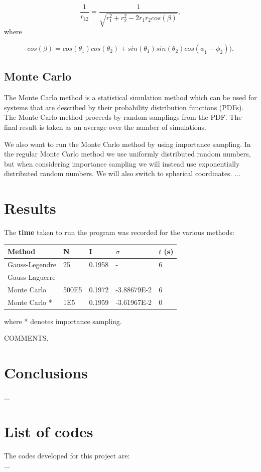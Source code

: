 \documentclass{article}
\begin{document}
\begin{multicols}{2}
\begin{equation*}
\frac{1}{r_{12}}= \frac{1}{\sqrt{r_1^2+r_2^2-2r_1r_2cos(\beta)}},
\end{equation*}
where

\begin{equation*}
cos(\beta) = cos(\theta_1)cos(\theta_2)+sin(\theta_1)sin(\theta_2)cos(\phi_1-\phi_2)).
\end{equation*}



\subsection{Monte Carlo}
The Monte Carlo method is a statistical simulation method which can be used for systems that are described by their probability distribution functions (PDFs). The Monte Carlo method proceeds by random samplings from the PDF. The final result is taken as an average over the number of simulations.

We also want to run the Monte Carlo method by using importance sampling. In the regular Monte Carlo method we use uniformly distributed random numbers, but when considering importance sampling we will instead use exponentially distributed random numbers. We will also switch to spherical coordinates.
... 


\section{Results}
The \textbf{time} taken to run the program was recorded for the various methods:

\begin{center}
\begin{tabular}{ l l l l l}\hline
	Method 				& N	 		&I			&$\sigma$		& $t$ (s) \\ \hline
	Gauss-Legendre 		& 25 			& 0.1958		& -				& 6 \\
	Gauss-Laguerre 		& -			& -			& -				& - \\
	Monte Carlo 			& 500E5 		& 0.1972		& -3.88679E-2		& 6 \\
	Monte Carlo * 			& 1E5		& 0.1959		& -3.61967E-2		& 0 \\
	\hline
\end{tabular}
\end{center}
where * denotes importance sampling.

COMMENTS.



\section{Conclusions}
...





\section{List of codes}

The codes developed for this project are:\\
...

\end{multicols}
\end{document}
